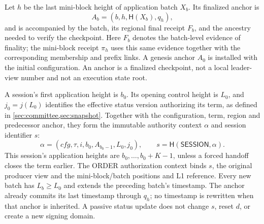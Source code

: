 \documentclass[11pt,a4paper,onecolumn]{article}
\newcommand{\Hash}{\mathsf H}
\newcommand{\Tag}[1]{\ensuremath{\mathsf{#1}}}
\begin{document}
Let $h$ be the last mini-block height of application batch $X_b$.
Its finalized anchor is
\[
 A_b=(b,h,\Hash(X_b),q_h),
\]
and is accompanied by the batch, its regional final receipt $F_b$, and
the ancestry needed to verify the checkpoint. Here $F_b$ denotes the
batch-level evidence of finality; the mini-block receipt $\pi_h$ uses this
same evidence together with the corresponding membership and prefix links.
A genesis anchor $A_0$ is installed with the
initial configuration. An anchor is a finalized checkpoint, not a local
leader-view number and not an execution state root.

A session's first application height is $b_0$. Its opening control height
is $L_0$, and $j_0=j(L_0)$ identifies the effective status version
authorizing its term, as defined in \cref{sec:committee,sec:snapshot}.
Together with the configuration, term, region and predecessor anchor,
they form the immutable authority context $\alpha$ and session identifier $s$:
\[
 \alpha=(\mathit{cfg},\tau,i,b_0,A_{b_0-1},L_0,j_0),
 \qquad s=\Hash(\Tag{SESSION},\alpha).
\]
This session's application heights are
$b_0,\ldots,b_0+K-1$, unless a forced handoff closes the term earlier.
The ORDER authorization context binds $s$, the original producer view and
the mini-block/batch positions and L1 reference. Every new batch has
$L_b\geq L_0$ and extends the preceding batch's timestamp. The anchor
already commits its last timestamp through $q_h$; no timestamp is rewritten
when that anchor is inherited. A passive status update does not change
$s$, reset $d$, or create a new signing domain.
\end{document}
